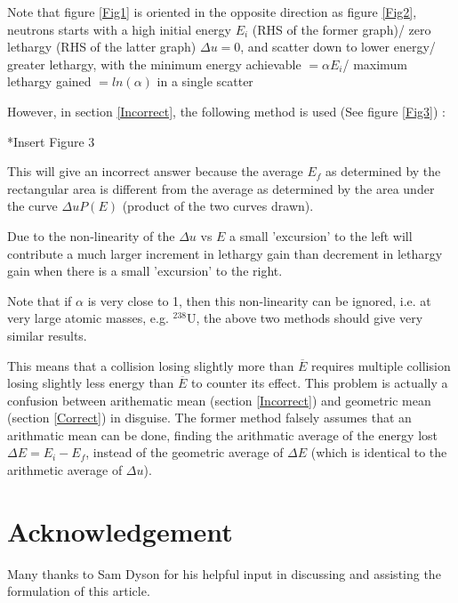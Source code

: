 \documentclass[a4paper, 12pt]{article}
\begin{document}
	Note that figure \ref{Fig1} is oriented in the opposite direction as figure \ref{Fig2}, neutrons starts with a high initial energy $E_i$ (RHS of the former graph)/ zero lethargy (RHS of the latter graph) $\Delta u=0$, and scatter down to lower energy/ greater lethargy, with the minimum energy achievable $= \alpha E_i$/ maximum lethargy gained $= ln(\alpha)$ in a single scatter

	
	However, in section \ref{Incorrect}, the following method is used (See figure \ref{Fig3}) :
	
	*Insert Figure 3
	
	This will give an incorrect answer because the average $E_f$ as determined by the rectangular area is different from the average as determined by the area under the curve $ \Delta u P(E)$ (product of the two curves drawn).

	Due to the non-linearity of the $\Delta u$ vs $E$ a small 'excursion' to the left will contribute a much larger increment in lethargy gain than decrement in lethargy gain when there is a small 'excursion' to the right.
	
	
	Note that if $\alpha$ is very close to 1, then this non-linearity can be ignored, i.e. at very large atomic masses, e.g. ${}^{238}$U, the above two methods should give very similar results.

	This means that a collision losing slightly more than $\overline{E}$ requires multiple collision losing slightly less energy than $\overline{E}$ to counter its effect.
	This problem is actually a confusion between arithematic mean (section \ref{Incorrect}) and geometric mean (section \ref{Correct}) in disguise. The former method falsely assumes that an arithmatic mean can be done, finding the arithmatic average of the energy lost $\Delta E = E_i-E_f$, instead of the geometric average of $\Delta E$ (which is identical to the arithmetic average of $\Delta u$).

\section{Acknowledgement}
	Many thanks to Sam Dyson for his helpful input in discussing and assisting the formulation of this article.
\end{document}
